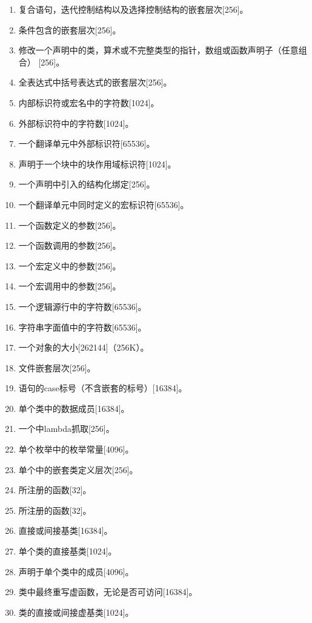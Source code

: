 \begin{enumerate}
  \item{复合语句，迭代控制结构以及选择控制结构的嵌套层次[256]。}
  \item{条件包含的嵌套层次[256]。}
  \item{修改一个声明中的类，算术或不完整类型的指针，数组或函数声明子（任意组合）
    [256]。}
  \item{全表达式中括号表达式的嵌套层次[256]。}
  \item{内部标识符或宏名中的字符数[1024]。}
  \item{外部标识符中的字符数[1024]。}
  \item{一个翻译单元中外部标识符[65536]。}
  \item{声明于一个块中的块作用域标识符[1024]。}
  \item{一个声明中引入的结构化绑定[256]。}
  \item{一个翻译单元中同时定义的宏标识符[65536]。}
  \item{一个函数定义的参数[256]。}
  \item{一个函数调用的参数[256]。}
  \item{一个宏定义中的参数[256]。}
  \item{一个宏调用中的参数[256]。}
  \item{一个逻辑源行中的字符数[65536]。}
  \item{字符串字面值中的字符数[65536]。}
  \item{一个对象的大小[262144]（256K）。}
  \item{文件嵌套层次[256]。}
  \item{语句的case标号（不含嵌套的标号）[16384]。}
  \item{单个类中的数据成员[16384]。}
  \item{一个中lambda抓取[256]。}
  \item{单个枚举中的枚举常量[4096]。}
  \item{单个中的嵌套类定义层次[256]。}
  \item{所注册的函数[32]。}
  \item{所注册的函数[32]。}
  \item{直接或间接基类[16384]。}
  \item{单个类的直接基类[1024]。}
  \item{声明于单个类中的成员[4096]。}
  \item{类中最终重写虚函数，无论是否可访问[16384]。}
  \item{类的直接或间接虚基类[1024]。}

\end{enumerate}
